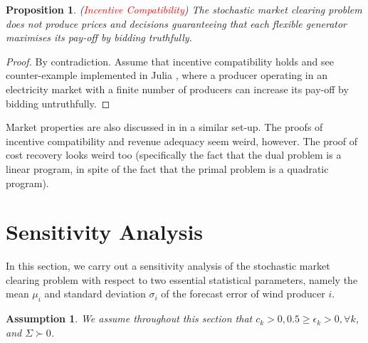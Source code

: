 \documentclass{article}
\newtheorem{proposition}{Proposition}
\newtheorem{assumption}{Assumption}
\begin{document}
\begin{proposition}
(\textcolor{red}{Incentive Compatibility}) The stochastic market clearing problem does not produce prices and decisions guaranteeing that each flexible generator maximises its pay-off by bidding truthfully.
\end{proposition}
\begin{proof}
By contradiction. Assume that incentive compatibility holds and see counter-example implemented in Julia \cite{SMER2022}, where a producer operating in an electricity market with a finite number of producers can increase its pay-off by bidding untruthfully.
\end{proof}

Market properties are also discussed in \cite{Ratha2019} in a similar set-up. The proofs of incentive compatibility and revenue adequacy seem weird, however. The proof of cost recovery looks weird too (specifically the fact that the dual problem is a linear program, in spite of the fact that the primal problem is a quadratic program). 

\section{Sensitivity Analysis}

In this section, we carry out a sensitivity analysis of the stochastic market clearing problem with respect to two essential statistical parameters, namely the mean $\mu_i$ and standard deviation $\sigma_i$ of the forecast error of wind producer $i$.

\begin{assumption}
We assume throughout this section that $c_k > 0, 0.5 \ge \epsilon_k > 0, \forall k$, and $\Sigma \succ 0$.
\end{assumption}
\end{document}
